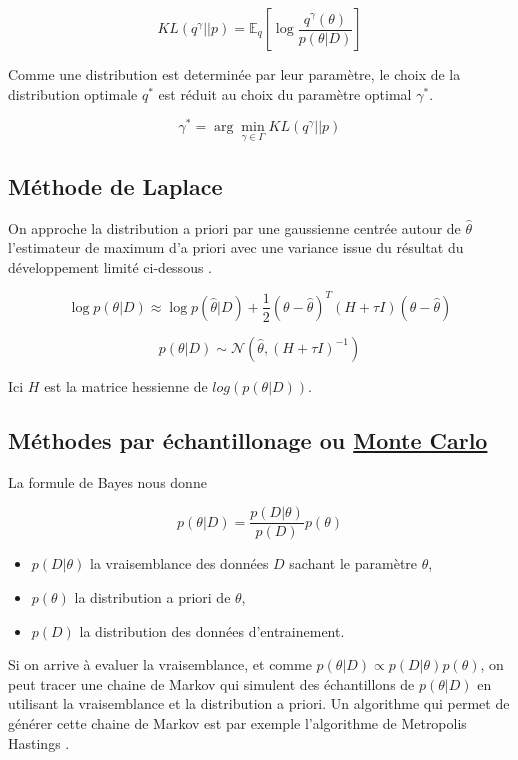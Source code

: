 \documentclass[french,12pt]{article}
\let\oldsubsection\subsection%
\renewcommand{\subsection}{%
  \renewcommand{\theequation}{\thesubsection.\arabic{equation}}%
  \oldsubsection}%
\begin{document}
\begin{equation}
    KL(q^{\gamma}||p) = \mathbb{E}_q \left[\log \frac{q^{\gamma}(\theta)}{p(\theta | D)}\right]  
\end{equation}

Comme une distribution est determinée par leur paramètre, le choix de la distribution  optimale $q^*$
est réduit au choix du paramètre optimal $\gamma^*$.

\begin{equation}
    \gamma^* = \arg \min_{\gamma \in \Gamma} KL(q^{\gamma}||p) 
\end{equation}


\subsection{Méthode de Laplace}

On approche la distribution a priori par une gaussienne
centrée autour de $\hat{\theta}$ l'estimateur de maximum d'a priori
avec une variance issue du résultat du développement limité ci-dessous \cite{Uncertainty_Deep} .

$$\log p(\theta | D) \approx \log p(\hat{\theta} | D)
    + \frac{1}{2} (\theta - \hat{\theta})^T (H + \tau I)
    (\theta - \hat{\theta})$$

$$p(\theta | D) \sim \mathcal{N}(\hat{\theta}, (H + \tau I)^{-1})$$

Ici $H$ est la matrice hessienne de $log( p (\theta | D ))$.

\subsection{Méthodes par échantillonage ou \href{https://en.wikipedia.org/wiki/Monte_Carlo_method}{Monte Carlo}}

La formule de Bayes nous donne

$$p(\theta | D) = \frac{p(D | \theta) }{p(D)}p(\theta)$$

\begin{itemize}
    \item $p(D | \theta)$ la vraisemblance des données $D$ sachant le paramètre $\theta$,
    \item $p(\theta)$ la distribution a priori de $\theta$,
    \item $p(D)$ la distribution des données d'entrainement.
\end{itemize}


Si on arrive à evaluer la vraisemblance, et comme $p(\theta | D) \propto p(D | \theta) p(\theta)$, 
on peut tracer une chaine de Markov qui simulent des échantillons de $p(\theta | D)$ en utilisant
la vraisemblance et la distribution a priori. Un algorithme qui permet de générer
cette chaine de Markov est par exemple l'algorithme de Metropolis Hastings \cite{Uncertainty_Deep}.
\end{document}
